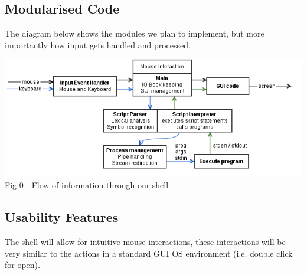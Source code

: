 \documentclass[a4paper,12pt]{article}
\begin{document}
\subsection*{Modularised Code}

The diagram below shows the modules we plan to implement, but more importantly how input gets handled and processed.

\begin{center}
  \includegraphics[width=16cm]{shellflow.png}\\
  \small Fig 0 - Flow of information through our shell
\end{center}

\pagebreak


\subsection*{Usability Features}
The shell will allow for intuitive mouse interactions, these interactions will be very similar to the actions in a standard GUI OS environment (i.e. double click for open).
\end{document}
